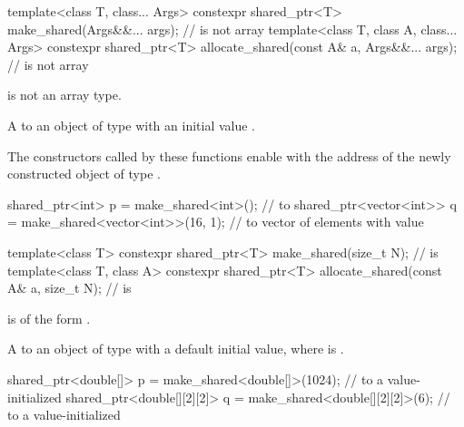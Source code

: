 %
%
\begin{itemdecl}
template<class T, class... Args>
  constexpr shared_ptr<T> make_shared(Args&&... args);                    //  is not array
template<class T, class A, class... Args>
  constexpr shared_ptr<T> allocate_shared(const A& a, Args&&... args);    //  is not array
\end{itemdecl}

\begin{itemdescr}
\pnum
\constraints
{} is not an array type.

\pnum
\returns
A  to an object of type 
with an initial value .

\pnum
\remarks
The  constructors called by these functions
enable 
with the address of the newly constructed object of type .

\pnum
\begin{example}
\begin{codeblock}
shared_ptr<int> p = make_shared<int>(); //  to 
shared_ptr<vector<int>> q = make_shared<vector<int>>(16, 1);
  //  to vector of  elements with value 
\end{codeblock}
\end{example}
\end{itemdescr}

%
%
\begin{itemdecl}
template<class T>
  constexpr shared_ptr<T> make_shared(size_t N);                          //  is 
template<class T, class A>
  constexpr shared_ptr<T> allocate_shared(const A& a, size_t N);          //  is 
\end{itemdecl}

\begin{itemdescr}
\pnum
\constraints
{} is of the form .

\pnum
\returns
A  to an object of type 
with a default initial value,
where  is .

\pnum
\begin{example}
\begin{codeblock}
shared_ptr<double[]> p = make_shared<double[]>(1024);
  //  to a value-initialized 
shared_ptr<double[][2][2]> q = make_shared<double[][2][2]>(6);
  //  to a value-initialized 
\end{codeblock}
\end{example}
\end{itemdescr}

